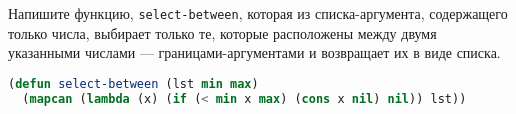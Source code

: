 Напишите функцию, \verb|select-between|, которая из списка-аргумента,
содержащего только числа, выбирает только те, которые расположены между двумя
указанными числами --- границами-аргументами и возвращает их в виде списка.

\begin{lstlisting}[language=Lisp]
(defun select-between (lst min max)
  (mapcan (lambda (x) (if (< min x max) (cons x nil) nil)) lst))
\end{lstlisting}

